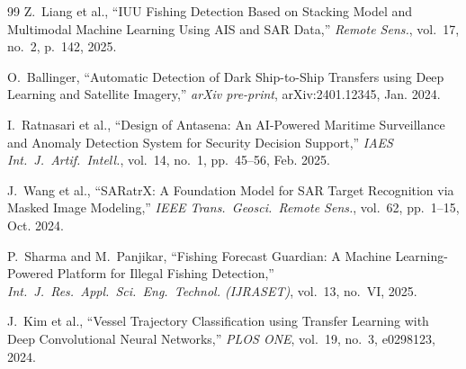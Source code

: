 \documentclass[journal]{IEEEtran}
\begin{document}
\begin{thebibliography}{99}
Z.~Liang et al.,
``IUU Fishing Detection Based on Stacking Model and Multimodal Machine Learning Using AIS and SAR Data,''
\textit{Remote Sens.}, vol.~17, no.~2, p.~142, 2025.

O.~Ballinger,
``Automatic Detection of Dark Ship-to-Ship Transfers using Deep Learning and Satellite Imagery,''
\textit{arXiv pre-print}, arXiv:2401.12345, Jan. 2024.

I.~Ratnasari et al.,
``Design of Antasena: An AI-Powered Maritime Surveillance and Anomaly Detection System for Security Decision Support,''
\textit{IAES Int.\ J.\ Artif.\ Intell.}, vol.~14, no.~1, pp.~45--56, Feb. 2025.

J.~Wang et al.,
``SARatrX: A Foundation Model for SAR Target Recognition via Masked Image Modeling,''
\textit{IEEE Trans.\ Geosci.\ Remote Sens.}, vol.~62, pp.~1--15, Oct. 2024.

P.~Sharma and M.~Panjikar,
``Fishing Forecast Guardian: A Machine Learning-Powered Platform for Illegal Fishing Detection,''
\textit{Int.\ J.\ Res.\ Appl.\ Sci.\ Eng.\ Technol. (IJRASET)}, vol.~13, no.~VI, 2025.

J.~Kim et al.,
``Vessel Trajectory Classification using Transfer Learning with Deep Convolutional Neural Networks,''
\textit{PLOS ONE}, vol.~19, no.~3, e0298123, 2024.

\end{thebibliography}
\end{document}
